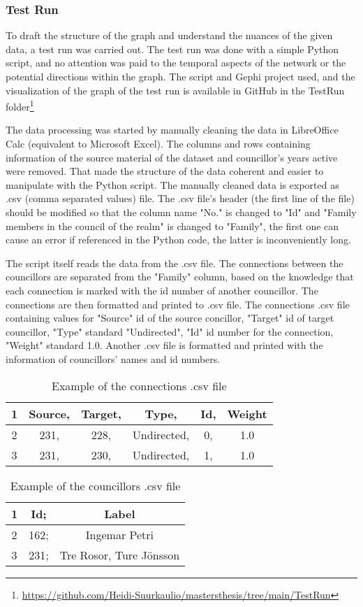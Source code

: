 \subsubsection{Test Run}

To draft the structure of the graph and understand the nuances of the given data, a test run was carried out. The test run was done with a simple Python script, and no attention was paid to the temporal aspects of the network or the potential directions within the graph. The script and Gephi project used, and the visualization of the graph of the test run is available in GitHub in the TestRun folder\footnote{\url{https://github.com/Heidi-Suurkaulio/mastersthesis/tree/main/TestRun}}

The data processing was started by manually cleaning the data in LibreOffice Calc (equivalent to Microsoft Excel). The columns and rows containing information of the source material of the dataset and councillor's years active were removed. That made the structure of the data coherent and easier to manipulate with the Python script. The manually cleaned data is exported as .csv (comma separated values) file. The .csv file's header (the first line of the file) should be modified so that the column name "No." is changed to "Id" and "Family members in the council of the realm" is changed to "Family", the first one can cause an error if referenced in the Python code, the latter is inconveniently long.

The script itself reads the data from the .csv file. The connections between the councillors are separated from the "Family" column, based on the knowledge that each connection is marked with the id number of another councillor. The connections are then formatted and printed to .csv file. The connections .csv file containing values for "Source" id of the source concillor, "Target" id of target councillor, "Type" standard "Undirected", "Id" id number for the connection, "Weight" standard 1.0. Another .csv file is formatted and printed with the information of councillors' names and id numbers.

\begin{table}[h]
	\caption{Example of the connections .csv file}
	\centering
	\begin{tabular}{cccccc}
		\hline
		1 &Source, &Target, &Type, &Id, &Weight \\
		\hline
		2 &231, &228, &Undirected, &0, &1.0 \\
		\hline
		3 &231, &230, &Undirected, &1, &1.0 \\
		\hline
	\end{tabular}
\end{table}
\begin{table}[h]
	\caption{Example of the councillors .csv file}
	\centering
	\begin{tabular}{ccc}	
		\hline
		1 &Id; &Label \\
		\hline
		2 &162; &Ingemar Petri \\
		\hline
		3 &231; &Tre Rosor, Ture Jönsson \\
		\hline
	\end{tabular}
\end{table}

